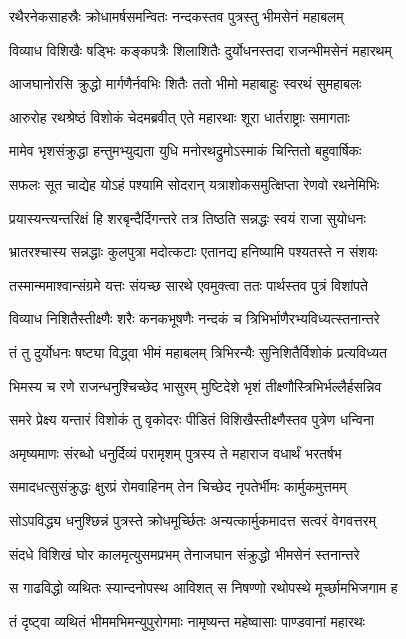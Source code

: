 \twolineshloka
{रथैरनेकसाहस्रैः क्रोधामर्षसमन्वितः}
{नन्दकस्तव पुत्रस्तु भीमसेनं महाबलम्}


\twolineshloka
{विव्याध विशिखैः षड्भिः कङ्कपत्रैः शिलाशितैः}
{दुर्योधनस्तदा राजन्भीमसेनं महारथम्}


\twolineshloka
{आजघानोरसि क्रुद्धो मार्गणैर्नवभिः शितैः}
{ततो भीमो महाबाहुः स्वरथं सुमहाबलः}


\twolineshloka
{आरुरोह रथश्रेष्ठं विशोकं चेदमब्रवीत्}
{एते महारथाः शूरा धार्तराष्ट्राः समागताः}


\twolineshloka
{मामेव भृशसंक्रुद्धा हन्तुमभ्युद्यता युधि}
{मनोरथद्रुमोऽस्माकं चिन्तितो बहुवार्षिकः}


\twolineshloka
{सफलः सूत चाद्येह योऽहं पश्यामि सोदरान्}
{यत्राशोकसमुत्क्षिप्ता रेणवो रथनेमिभिः}


\twolineshloka
{प्रयास्यन्त्यन्तरिक्षं हि शरबृन्दैर्दिगन्तरे}
{तत्र तिष्ठति सन्नद्धः स्वयं राजा सुयोधनः}


\twolineshloka
{भ्रातरश्चास्य सन्नद्धाः कुलपुत्रा मदोत्कटाः}
{एतानद्य हनिष्यामि पश्यतस्ते न संशयः}


\twolineshloka
{तस्मान्ममाश्वान्संग्रमे यत्तः संयच्छ सारथे}
{एवमुक्त्वा ततः पार्थस्तव पुत्रं विशांपते}


\twolineshloka
{विव्याध निशितैस्तीक्ष्णैः शरैः कनकभूषणैः}
{नन्दकं च त्रिभिर्भाणैरभ्यविध्यत्स्तनान्तरे}


\twolineshloka
{तं तु दुर्योधनः षष्ट्या विद्ध्वा भीमं महाबलम्}
{त्रिभिरन्यैः सुनिशितैर्विशोकं प्रत्यविध्यत}


\twolineshloka
{भिमस्य च रणे राजन्धनुश्चिच्छेद भासुरम्}
{मुष्टिदेशे भृशं तीक्ष्णौस्त्रिभिर्भल्लैर्हसन्निव}


\twolineshloka
{समरे प्रेक्ष्य यन्तारं विशोकं तु वृकोदरः}
{पीडितं विशिखैस्तीक्ष्णैस्तव पुत्रेण धन्विना}


\twolineshloka
{अमृष्यमाणः संरब्धो धनुर्दिव्यं परामृशम्}
{पुत्रस्य ते महाराज वधार्थं भरतर्षभ}


\twolineshloka
{समादधत्सुसंक्रुद्धः क्षुरप्रं रोमवाहिनम्}
{तेन चिच्छेद नृपतेर्भीमः कार्मुकमुत्तमम्}


\twolineshloka
{सोऽपविद्ध्य धनुश्छिन्नं पुत्रस्ते क्रोधमूर्च्छितः}
{अन्यत्कार्मुकमादत्त सत्वरं वेगवत्तरम्}


\twolineshloka
{संदधे विशिखं घोर कालमृत्युसमप्रभम्}
{तेनाजघान संक्रुद्धो भीमसेनं स्तनान्तरे}


\twolineshloka
{स गाढविद्धो व्यथितः स्यान्दनोपस्थ आविशत्}
{स निषण्णो रथोपस्थे मूर्च्छामभिजगाम ह}


\twolineshloka
{तं दृष्ट्वा व्यथितं भीममभिमन्युपुरोगमाः}
{नामृष्यन्त महेष्वासाः पाण्डवानां महारथः}


